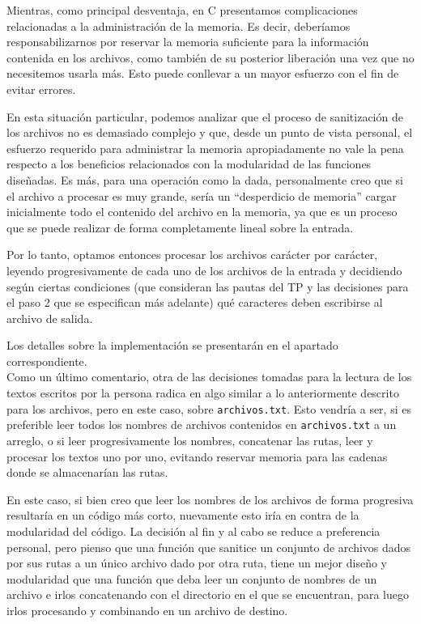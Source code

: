\documentclass[a4paper]{article}
\begin{document}
Mientras, como principal desventaja, en C presentamos complicaciones relacionadas a la administración de la memoria. Es decir, deberíamos responsabilizarnos por reservar la memoria suficiente para la información contenida en los archivos, como también de su posterior liberación una vez que no necesitemos usarla más. Esto puede conllevar a un mayor esfuerzo con el fin de evitar errores.

En esta situación particular, podemos analizar que el proceso de sanitización de los archivos no es demasiado complejo y que, desde un punto de vista personal, el esfuerzo requerido para administrar la memoria apropiadamente no vale la pena respecto a los beneficios relacionados con la modularidad de las funciones diseñadas. Es más, para una operación como la dada, personalmente creo que si el archivo a procesar es muy grande, sería un  ``desperdicio de memoria'' cargar inicialmente todo el contenido del archivo en la memoria, ya que es un proceso que se puede realizar de forma completamente lineal sobre la entrada.

Por lo tanto, optamos entonces procesar los archivos carácter por carácter, leyendo progresivamente de cada uno de los archivos de la entrada y decidiendo según ciertas condiciones (que consideran las pautas del TP y las decisiones para el paso 2 que se especifican más adelante) qué caracteres deben escribirse al archivo de salida.

Los detalles sobre la implementación se presentarán en el apartado correspondiente. \\

Como un último comentario, otra de las decisiones tomadas para la lectura de los textos escritos por la persona radica en algo similar a lo anteriormente descrito para los archivos, pero en este caso, sobre \texttt{archivos.txt}. Esto vendría a ser, si es preferible leer todos los nombres de archivos contenidos en \texttt{archivos.txt} a un arreglo, o si leer progresivamente los nombres, concatenar las rutas, leer y procesar los textos uno por uno, evitando reservar memoria para las cadenas donde se almacenarían las rutas.

En este caso, si bien creo que leer los nombres de los archivos de forma progresiva resultaría en un código más corto, nuevamente esto iría en contra de la modularidad del código. La decisión al fin y al cabo se reduce a preferencia personal, pero pienso que una función que sanitice un conjunto de archivos dados por sus rutas a un único archivo dado por otra ruta, tiene un mejor diseño y modularidad que una función que deba leer un conjunto de nombres de un archivo e irlos concatenando con el directorio en el que se encuentran, para luego irlos procesando y combinando en un archivo de destino.
\end{document}
